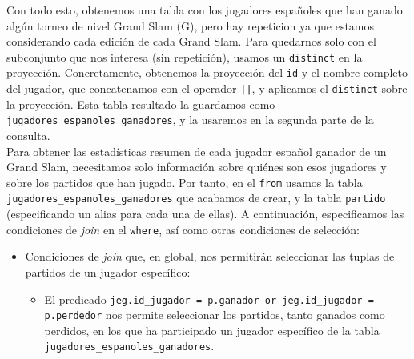Con todo esto, obtenemos una tabla con los jugadores españoles que han ganado algún torneo de nivel Grand Slam (G), pero hay repeticion ya que estamos considerando cada edición de cada Grand Slam. Para quedarnos solo con el subconjunto que nos interesa (sin repetición), usamos un \texttt{distinct} en la proyección. Concretamente, obtenemos la proyección del \texttt{id} y el nombre completo del jugador, que concatenamos con el operador \texttt{||}, y aplicamos el \texttt{distinct} sobre la proyección. Esta tabla resultado la guardamos como \texttt{jugadores\_espanoles\_ganadores}, y la usaremos en la segunda parte de la consulta. \\

Para obtener las estadísticas resumen de cada jugador español ganador de un Grand Slam, necesitamos solo información sobre quiénes son esos jugadores y sobre los partidos que han jugado. Por tanto, en el \texttt{from} usamos la tabla \texttt{jugadores\_espanoles\_ganadores} que acabamos de crear, y la tabla \texttt{partido} (especificando un alias para cada una de ellas). A continuación, especificamos las condiciones de \textit{join} en el \texttt{where}, así como otras condiciones de selección:
\begin{itemize}
\item Condiciones de \textit{join} que, en global, nos permitirán seleccionar las tuplas de partidos de un jugador específico:
\begin{itemize}
\item El predicado \texttt{jeg.id\_jugador = p.ganador or jeg.id\_jugador = p.perdedor} nos permite seleccionar los partidos, tanto ganados como perdidos, en los que ha participado un jugador específico de la tabla \texttt{jugadores\_espanoles\_ganadores}.
\end{itemize}
\end{itemize}

